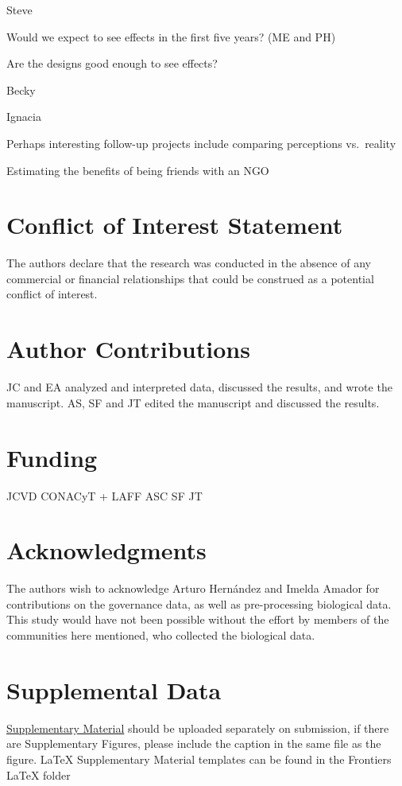 \documentclass{frontiersSCNS}
\theoremstyle{definition}
\theoremstyle{definition}
\theoremstyle{definition}
\theoremstyle{remark}
\begin{document}
Steve

Would we expect to see effects in the first five years? (ME and PH)

Are the designs good enough to see effects?

Becky

Ignacia

Perhaps interesting follow-up projects include comparing perceptions
vs.~reality

Estimating the benefits of being friends with an NGO

\section*{Conflict of Interest Statement}

The authors declare that the research was conducted in the absence of
any commercial or financial relationships that could be construed as a
potential conflict of interest.

\section*{Author Contributions}

JC and EA analyzed and interpreted data, discussed the results, and
wrote the manuscript. AS, SF and JT edited the manuscript and discussed
the results.

\section*{Funding}

JCVD CONACyT + LAFF ASC SF JT

\section*{Acknowledgments}

The authors wish to acknowledge Arturo Hernández and Imelda Amador for
contributions on the governance data, as well as pre-processing
biological data. This study would have not been possible without the
effort by members of the communities here mentioned, who collected the
biological data.

\section*{Supplemental Data}

\href{http://home.frontiersin.org/about/author-guidelines#SupplementaryMaterial}{Supplementary Material}
should be uploaded separately on submission, if there are Supplementary
Figures, please include the caption in the same file as the figure.
LaTeX Supplementary Material templates can be found in the Frontiers
LaTeX folder
\end{document}
